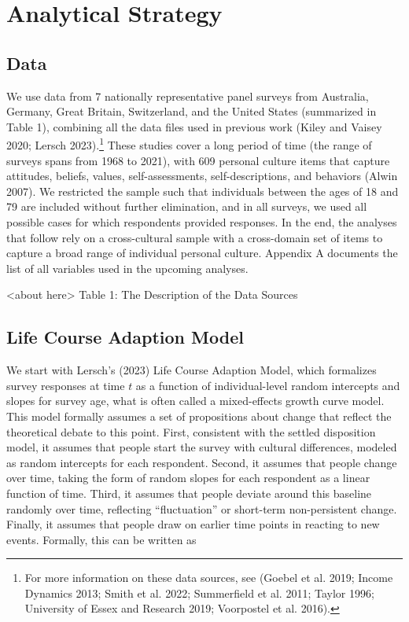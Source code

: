 \documentclass[
  12pt,
]{article}
\begin{document}
\hypertarget{analytical-strategy}{%
\section{Analytical Strategy}\label{analytical-strategy}}

\hypertarget{data}{%
\subsection{Data}\label{data}}

We use data from 7 nationally representative panel surveys from
Australia, Germany, Great Britain, Switzerland, and the United States
(summarized in Table 1), combining all the data files used in previous
work (Kiley and Vaisey 2020; Lersch 2023).\footnote{For more information
  on these data sources, see (Goebel et al. 2019; Income Dynamics 2013;
  Smith et al. 2022; Summerfield et al. 2011; Taylor 1996; University of
  Essex and Research 2019; Voorpostel et al. 2016).} These studies cover
a long period of time (the range of surveys spans from 1968 to 2021),
with 609 personal culture items that capture attitudes, beliefs, values,
self-assessments, self-descriptions, and behaviors (Alwin 2007). We
restricted the sample such that individuals between the ages of 18 and
79 are included without further elimination, and in all surveys, we used
all possible cases for which respondents provided responses. In the end,
the analyses that follow rely on a cross-cultural sample with a
cross-domain set of items to capture a broad range of individual
personal culture. Appendix A documents the list of all variables used in
the upcoming analyses.

\begin{center}
<about here> 
Table 1: The Description of the Data Sources
\end{center}

\hypertarget{life-course-adaption-model}{%
\subsection{Life Course Adaption
Model}\label{life-course-adaption-model}}

We start with Lersch's (2023) Life Course Adaption Model, which
formalizes survey responses at time \(t\) as a function of
individual-level random intercepts and slopes for survey age, what is
often called a mixed-effects growth curve model. This model formally
assumes a set of propositions about change that reflect the theoretical
debate to this point. First, consistent with the settled disposition
model, it assumes that people start the survey with cultural
differences, modeled as random intercepts for each respondent. Second,
it assumes that people change over time, taking the form of random
slopes for each respondent as a linear function of time. Third, it
assumes that people deviate around this baseline randomly over time,
reflecting ``fluctuation'' or short-term non-persistent change. Finally,
it assumes that people draw on earlier time points in reacting to new
events. Formally, this can be written as
\end{document}
